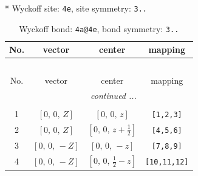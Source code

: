 \documentclass[fleqn,8pt]{jsarticle}
\begin{document}
* Wyckoff site: {\tt 4e}, site symmetry: {\tt 3..}
\renewcommand{\arraystretch}{1.2}
\begin{longtable}{cccc}
\caption{Wyckoff bond: {\tt 4a@4e}, bond symmetry: {\tt 3..}}
 \\
 \hline \hline
No. & vector & center & mapping \\ \hline \endfirsthead

\multicolumn{3}{l}{\tablename\ \thetable{}} \\
 \hline \hline
No. & vector & center & mapping \\ \hline \endhead

 \hline \hline
\multicolumn{3}{r}{\footnotesize\it continued ...} \\ \endfoot

 \hline \hline
\multicolumn{3}{r}{} \\ \endlastfoot

1 & $\left[ 0,\, 0,\, Z \right]$ & $\left[ 0,\, 0,\, z \right]$ & {\tt [1,2,3]} \\ \hline
2 & $\left[ 0,\, 0,\, Z \right]$ & $\left[ 0,\, 0,\, z + \frac{1}{2} \right]$ & {\tt [4,5,6]} \\ \hline
3 & $\left[ 0,\, 0,\, - Z \right]$ & $\left[ 0,\, 0,\, - z \right]$ & {\tt [7,8,9]} \\ \hline
4 & $\left[ 0,\, 0,\, - Z \right]$ & $\left[ 0,\, 0,\, \frac{1}{2} - z \right]$ & {\tt [10,11,12]} \\
\end{longtable}
\renewcommand{\arraystretch}{1.2}
\end{document}
